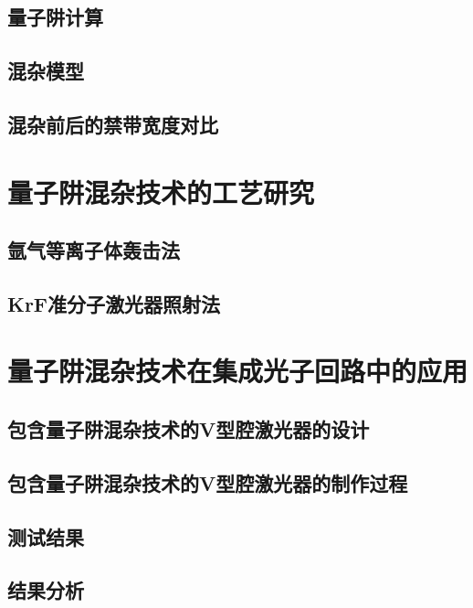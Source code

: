 \documentclass{ZJUthesis}
\begin{document}
\section{量子阱计算}

\section{混杂模型}

\section{混杂前后的禁带宽度对比}

\chapter{量子阱混杂技术的工艺研究}

\section{氩气等离子体轰击法}

\section{KrF准分子激光器照射法}


\chapter{量子阱混杂技术在集成光子回路中的应用}

\section{包含量子阱混杂技术的V型腔激光器的设计}

\section{包含量子阱混杂技术的V型腔激光器的制作过程}

\section{测试结果}

\section{结果分析}
\end{document}
